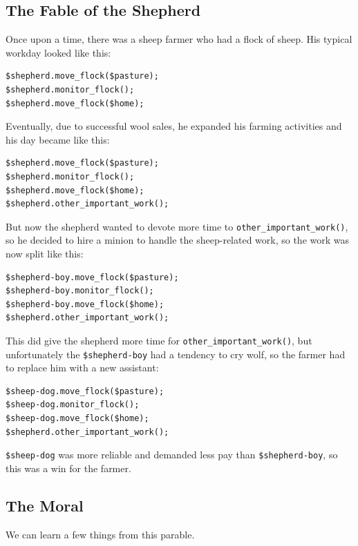\subsection{The Fable of the Shepherd} 

Once upon a time, there was a sheep farmer who had a 
flock of sheep. His typical workday looked like this:

\begin{verbatim}
$shepherd.move_flock($pasture);
$shepherd.monitor_flock();
$shepherd.move_flock($home);
\end{verbatim}

Eventually, due to successful wool sales, he expanded 
his farming activities and his day became like this:

\begin{verbatim}
$shepherd.move_flock($pasture);
$shepherd.monitor_flock();
$shepherd.move_flock($home);
$shepherd.other_important_work();
\end{verbatim}

But now the shepherd wanted to devote more time to 
\verb'other_important_work()', so he decided to hire 
a minion to handle the sheep-related work, so the 
work was now split like this:

\begin{verbatim}
$shepherd-boy.move_flock($pasture);
$shepherd-boy.monitor_flock();
$shepherd-boy.move_flock($home);
$shepherd.other_important_work();
\end{verbatim}

This did give the shepherd more time for 
\verb'other_important_work()', but unfortunately the 
\verb'$shepherd-boy' had a tendency to cry wolf, so 
the farmer had to replace him with a new assistant:

\begin{verbatim}
$sheep-dog.move_flock($pasture);
$sheep-dog.monitor_flock();
$sheep-dog.move_flock($home);
$shepherd.other_important_work();
\end{verbatim}

\verb'$sheep-dog' was more reliable and demanded 
less pay than \verb'$shepherd-boy', so this was 
a win for the farmer.

\subsection{The Moral}

We can learn a few things from this parable.

